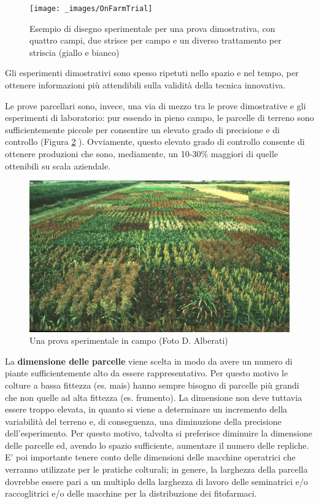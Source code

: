 \documentclass[a4paper,12pt,oneside]{book}
\begin{document}
\begin{figure}

{\centering \texttt{[image: \_images/OnFarmTrial]} 

}

\caption{Esempio di disegno sperimentale per una prova dimostrativa, con quattro campi, due strisce per campo e un diverso trattamento per striscia (giallo e bianco)}\label{fig:figName30a}
\end{figure}

Gli esperimenti dimostrativi sono spesso ripetuti nello spazio e nel tempo, per ottenere informazioni più attendibili sulla validità della tecnica innovativa.

Le prove parcellari sono, invece, una via di mezzo tra le prove dimostrative e gli esperimenti di laboratorio: pur essendo in pieno campo, le parcelle di terreno sono sufficientemente piccole per consentire un elevato grado di precisione e di controllo (Figura \ref{fig:figName21} ). Ovviamente, questo elevato grado di controllo consente di ottenere produzioni che sono, mediamente, un 10-30\% maggiori di quelle ottenibili su scala aziendale.

\begin{figure}

{\centering \includegraphics[width=0.9\linewidth]{_images/SorgoProveVarietali} 

}

\caption{Una prova sperimentale in campo (Foto D. Alberati)}\label{fig:figName21}
\end{figure}

La \textbf{dimensione delle parcelle} viene scelta in modo da avere un numero di piante sufficientemente alto da essere rappresentativo. Per questo motivo le colture a bassa fittezza (es. mais) hanno sempre bisogno di parcelle più grandi che non quelle ad alta fittezza (es. frumento). La dimensione non deve tuttavia essere troppo elevata, in quanto si viene a determinare un incremento della variabilità del terreno e, di conseguenza, una diminuzione della precisione dell'esperimento. Per questo motivo, talvolta si preferisce diminuire la dimensione delle parcelle ed, avendo lo spazio sufficiente, aumentare il numero delle repliche. E' poi importante tenere conto delle dimensioni delle macchine operatrici che verranno utilizzate per le pratiche colturali; in genere, la larghezza della parcella dovrebbe essere pari a un multiplo della larghezza di lavoro delle seminatrici e/o raccoglitrici e/o delle macchine per la distribuzione dei fitofarmaci.
\end{document}
